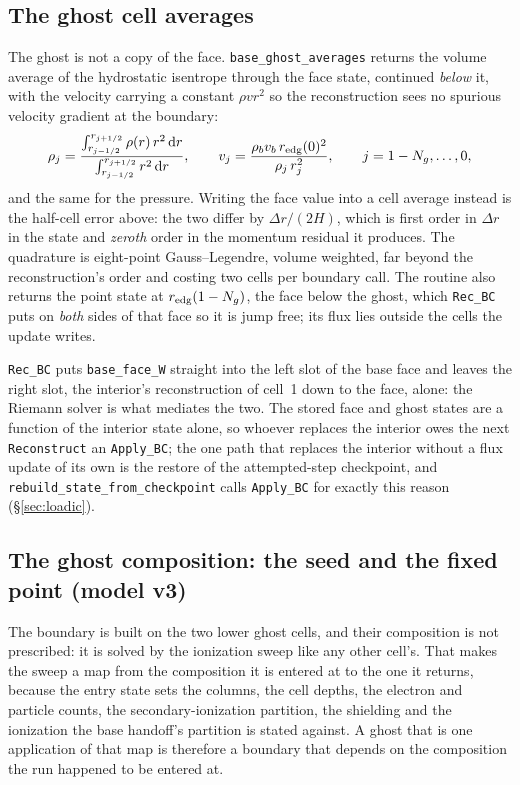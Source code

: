 \documentclass[english,a4paper]{my_memo}
\begin{document}
\subsection{The ghost cell averages}
\label{sec:baseghost}

The ghost is not a copy of the face. \texttt{base\_ghost\_averages} returns
the volume average of the hydrostatic isentrope through the face state,
continued \emph{below} it, with the velocity carrying a constant
$\rho v r^2$ so the reconstruction sees no spurious velocity gradient at the
boundary:
\begin{equation}
\rho_j = \frac{\int_{r_{j-1/2}}^{r_{j+1/2}} \rho(r)\, r^2\,\mathrm{d}r}
              {\int_{r_{j-1/2}}^{r_{j+1/2}} r^2\,\mathrm{d}r},
\qquad
v_j = \frac{\rho_b v_b\, r_{\rm edg}(0)^2}{\rho_j\, r_j^2},
\qquad j = 1-N_g,\dots,0 ,
\end{equation}
and the same for the pressure. Writing the face value into a cell average
instead is the half-cell error above: the two differ by $\Delta r/(2H)$,
which is first order in $\Delta r$ in the state and \emph{zeroth} order in
the momentum residual it produces. The quadrature is eight-point
Gauss--Legendre, volume weighted, far beyond the reconstruction's order and
costing two cells per boundary call. The routine also returns the point
state at $r_{\rm edg}(1-N_g)$, the face below the ghost, which
\texttt{Rec\_BC} puts on \emph{both} sides of that face so it is jump free;
its flux lies outside the cells the update writes.

\texttt{Rec\_BC} puts \texttt{base\_face\_W} straight into the left slot of
the base face and leaves the right slot, the interior's reconstruction of
cell~1 down to the face, alone: the Riemann solver is what mediates the two.
The stored face and ghost states are a function of the interior state alone,
so whoever replaces the interior owes the next \texttt{Reconstruct} an
\texttt{Apply\_BC}; the one path that replaces the interior without a flux
update of its own is the restore of the attempted-step checkpoint, and
\texttt{rebuild\_state\_from\_checkpoint} calls \texttt{Apply\_BC} for
exactly this reason (\S\ref{sec:loadic}).

\subsection{The ghost composition: the seed and the fixed point (model v3)}
\label{sec:ghostfixedpoint}

The boundary is built on the two lower ghost cells, and their composition is
not prescribed: it is solved by the ionization sweep like any other cell's.
That makes the sweep a map from the composition it is entered at to the one
it returns, because the entry state sets the columns, the cell depths, the
electron and particle counts, the secondary-ionization partition, the
shielding and the ionization the base handoff's partition is stated against.
A ghost that is one application of that map is therefore a boundary that
depends on the composition the run happened to be entered at.
\end{document}
